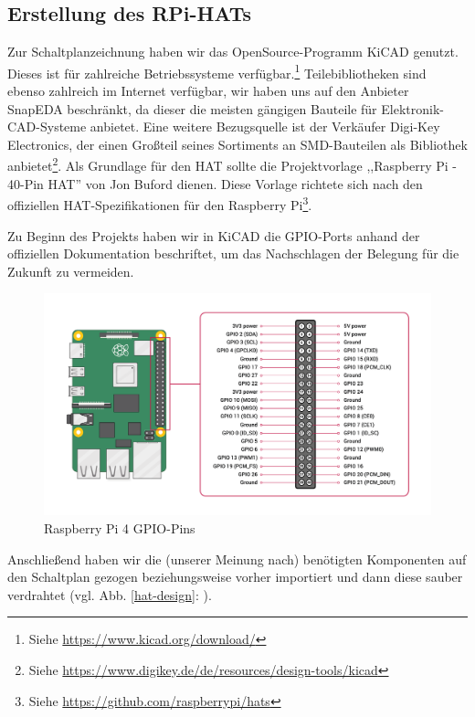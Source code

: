\subsection{Erstellung des RPi-HATs}\label{hw_hat}
Zur Schaltplanzeichnung haben wir das OpenSource-Programm KiCAD genutzt.
Dieses ist für zahlreiche Betriebssysteme verfügbar.\footnote{Siehe \url{https://www.kicad.org/download/}} 
Teilebibliotheken sind ebenso zahlreich im Internet verfügbar, wir haben uns auf den Anbieter SnapEDA beschränkt, da dieser die meisten gängigen Bauteile für Elektronik-CAD-Systeme anbietet. 
Eine weitere Bezugsquelle ist der Verkäufer Digi-Key Electronics, der einen Großteil seines Sortiments an SMD-Bauteilen als Bibliothek anbietet\footnote{Siehe \url{https://www.digikey.de/de/resources/design-tools/kicad}}. 
Als Grundlage für den HAT sollte die Projektvorlage ,,Raspberry Pi - 40-Pin HAT'' von Jon Buford dienen.
Diese Vorlage richtete sich nach den offiziellen HAT-Spezifikationen für den Raspberry Pi\footnote{Siehe \url{https://github.com/raspberrypi/hats}}.\par
\noindent Zu Beginn des Projekts haben wir in KiCAD die GPIO-Ports anhand der offiziellen Dokumentation beschriftet, um das Nachschlagen der Belegung für die Zukunft zu vermeiden.
\begin{figure}[H]
	\includegraphics[width=1\textwidth]{img/GPIO-Pinout-Diagram-2.png}
	\caption[Raspberry Pi 4 GPIO-Pins]{Raspberry Pi 4 GPIO-Pins}
	\label{rpi-gpio-pins}
\end{figure}
\par
\noindent Anschließend haben wir die (unserer Meinung nach) benötigten Komponenten auf den Schaltplan gezogen beziehungsweise vorher importiert und dann diese sauber verdrahtet (vgl. Abb. \ref{hat-design}: ).\par
